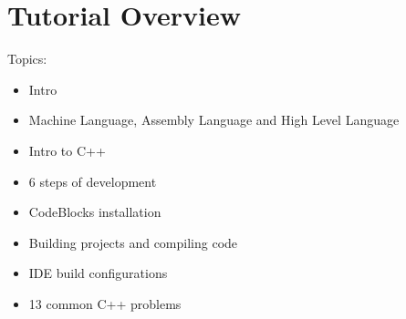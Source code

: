\chapter{Tutorial Overview}

Topics:
\begin{itemize}
    \item Intro
    \item Machine Language, Assembly Language and High Level Language
    \item Intro to C++
    \item 6 steps of development
    \item CodeBlocks installation
    \item Building projects and compiling code
    \item IDE build configurations
    \item 13 common C++ problems
\end{itemize}
